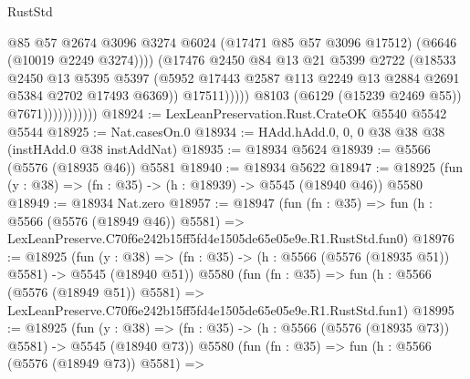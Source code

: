 \begin{lexlean}{RustStd}
\begin{coremodule}
                                      @85
                                      @57
                                      @2674
                                      @3096
                                      @3274
                                      @6024
                                      (@17471 @85 @57 @3096 @17512)
                                      (@6646 (@10019 @2249 @3274))))
                                  (@17476
                                    @2450
                                    @84
                                    @13
                                    @21
                                    @5399
                                    @2722
                                    (@18533
                                      @2450
                                      @13
                                      @5395
                                      @5397
                                      (@5952
                                        @17443
                                        @2587
                                        @113
                                        @2249
                                        @13
                                        @2884
                                        @2691
                                        @5384
                                        @2702
                                        @17493
                                        @6369))
                                    @17511)))))
                          @8103
                          (@6129 (@15239 @2469 @55))
                          @7671)))))))))))
@18924 := LexLeanPreservation.Rust.CrateOK @5540 @5542 @5544
@18925 := Nat.casesOn.{0}
@18934 := HAdd.hAdd.{0, 0, 0} @38 @38 @38 (instHAdd.{0} @38 instAddNat)
@18935 := @18934 @5624
@18939 := @5566 (@5576 (@18935 @46)) @5581
@18940 := @18934 @5622
@18947 := @18925 (fun (y : @38) => (fn : @35) -> (h : @18939) -> @5545 (@18940 @46)) @5580
@18949 := @18934 Nat.zero
@18957 := @18947
    (fun (fn : @35) =>
    fun (h : @5566 (@5576 (@18949 @46)) @5581) =>
    LexLeanPreserve.C70f6e242b15ff5fd4e1505de65e05e9e.R1.RustStd.fun0)
@18976 := @18925
    (fun (y : @38) => (fn : @35) -> (h : @5566 (@5576 (@18935 @51)) @5581) -> @5545 (@18940 @51))
    @5580
    (fun (fn : @35) =>
    fun (h : @5566 (@5576 (@18949 @51)) @5581) =>
    LexLeanPreserve.C70f6e242b15ff5fd4e1505de65e05e9e.R1.RustStd.fun1)
@18995 := @18925
    (fun (y : @38) => (fn : @35) -> (h : @5566 (@5576 (@18935 @73)) @5581) -> @5545 (@18940 @73))
    @5580
    (fun (fn : @35) =>
    fun (h : @5566 (@5576 (@18949 @73)) @5581) =>

\end{coremodule}
\end{lexlean}
